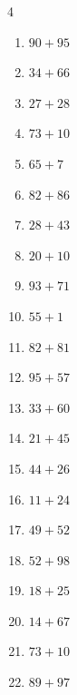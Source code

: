 \begin{multicols}{4}
\begin{enumerate}
  \item $90+95$
        \phantom{$=185$}

  \item $34+66$
        \phantom{$=100$}

  \item $27+28$
        \phantom{$=55$}

  \item $73+10$
        \phantom{$=83$}

  \item $65+7$
        \phantom{$=72$}

  \item $82+86$
        \phantom{$=168$}

  \item $28+43$
        \phantom{$=71$}

  \item $20+10$
        \phantom{$=30$}

  \item $93+71$
        \phantom{$=164$}

  \item $55+1$
        \phantom{$=56$}

  \item $82+81$
        \phantom{$=163$}

  \item $95+57$
        \phantom{$=152$}

  \item $33+60$
        \phantom{$=93$}

  \item $21+45$
        \phantom{$=66$}

  \item $44+26$
        \phantom{$=70$}

  \item $11+24$
        \phantom{$=35$}

  \item $49+52$
        \phantom{$=101$}

  \item $52+98$
        \phantom{$=150$}

  \item $18+25$
        \phantom{$=43$}

  \item $14+67$
        \phantom{$=81$}

  \item $73+10$
        \phantom{$=83$}

  \item $89+97$
        \phantom{$=186$}


\end{enumerate}
\end{multicols}
